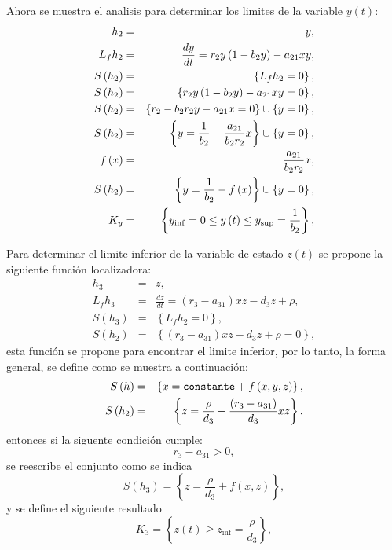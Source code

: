 \documentclass[letterpaper,11pt]{article}
\begin{document}
Ahora se muestra el analisis para determinar los limites de la variable $%
y\left( t\right) $:%
\begin{eqnarray*}
h_{2} &=&y, \\
L_{f}h_{2} &=&\frac{dy}{dt}=r_{2}y\left( 1-b_{2}y\right) -a_{21}xy, \\
S\left( h_{2}\right) &=&\left\{ L_{f}h_{2}=0\right\} , \\
S\left( h_{2}\right) &=&\left\{ r_{2}y\left( 1-b_{2}y\right)
-a_{21}xy=0\right\} , \\
S\left( h_{2}\right) &=&\left\{ r_{2}-b_{2}r_{2}y-a_{21}x=0\right\} \cup
\left\{ y=0\right\} , \\
S\left( h_{2}\right) &=&\left\{ y=\frac{1}{b_{2}}-\frac{a_{21}}{b_{2}r_{2}}%
x\right\} \cup \left\{ y=0\right\} , \\
f\left( x\right) &=&\frac{a_{21}}{b_{2}r_{2}}x, \\
S\left( h_{2}\right) &=&\left\{ y=\frac{1}{b_{2}}-f\left( x\right) \right\}
\cup \left\{ y=0\right\} , \\
K_{y} &=&\left\{ y_{\inf }=0\leq y\left( t\right) \leq y_{\sup }=\frac{1}{%
b_{2}}\right\} ,
\end{eqnarray*}

Para determinar el limite inferior de la variable de estado $z\left(
t\right) $ se propone la siguiente funci\'{o}n localizadora:%
\begin{eqnarray*}
h_{3} &=&z, \\
L_{f}h_{3} &=&\frac{dz}{dt}=\left( r_{3}-a_{31}\right) xz-d_{3}z+\rho , \\
S\left( h_{3}\right) &=&\left\{ L_{f}h_{2}=0\right\} , \\
S\left( h_{2}\right) &=&\left\{ \left( r_{3}-a_{31}\right) xz-d_{3}z+\rho
=0\right\} ,
\end{eqnarray*}%
esta funci\'{o}n se propone para encontrar el limite inferior, por lo tanto,
la forma general, se define como se muestra a continuaci\'{o}n:%
\begin{eqnarray*}
S\left( h\right) &=&\left\{ x=\text{\texttt{constante}}+{\scriptsize f}%
\left( x,y,z\right) \right\} , \\
S\left( h_{2}\right) &=&\left\{ z=\frac{\rho }{d_{3}}+\frac{\left(
r_{3}-a_{31}\right) }{d_{3}}xz\right\} ,
\end{eqnarray*}%
entonces si la siguente condici\'{o}n cumple:%
\begin{equation*}
r_{3}-a_{31}>0,
\end{equation*}%
se reescribe el conjunto como se indica%
\begin{equation*}
S\left( h_{3}\right) =\left\{ z=\frac{\rho }{d_{3}}+f\left( x,z\right)
\right\} ,
\end{equation*}%
y se define el siguiente resultado%
\begin{equation*}
K_{3}=\left\{ z\left( t\right) \geq z_{\inf }=\frac{\rho }{d_{3}}\right\} ,
\end{equation*}
\end{document}
